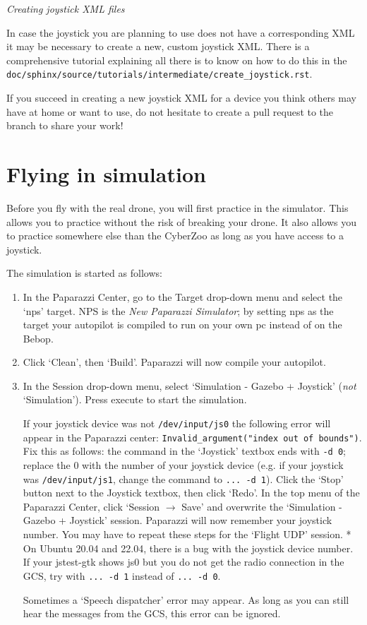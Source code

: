 \textit{Creating joystick XML files}

In case the joystick you are planning to use does not have a corresponding XML it may be necessary to create a new, custom joystick XML. There is a comprehensive tutorial explaining all there is to know on how to do this in the \texttt{doc/sphinx/source/tutorials/intermediate/create\_joystick.rst}.

If you succeed in creating a new joystick XML for a device you think others may have at home or want to use, do not hesitate to create a pull request to the \coursebranch{} branch to share your work!

\section{Flying in simulation}
Before you fly with the real drone, you will first practice in the simulator.
This allows you to practice without the risk of breaking your drone. It also allows you to practice somewhere else than the CyberZoo as long as you have access to a joystick.

\medskip

The simulation is started as follows:
\begin{enumerate}
	\item In the Paparazzi Center, go to the Target drop-down menu and select the `nps' target. NPS is the \emph{New Paparazzi Simulator}; by setting nps as the target your autopilot is compiled to run on your own pc instead of on the Bebop.
	\item Click `Clean', then `Build'. Paparazzi will now compile your autopilot.
	\item In the Session drop-down menu, select `Simulation - Gazebo + Joystick' (\emph{not} `Simulation'). Press execute to start the simulation.
	
	If your joystick device was not \verb"/dev/input/js0" the following error will appear in the Paparazzi center: \verb|Invalid_argument("index out of bounds")|. Fix this as follows: the command in the `Joystick' textbox ends with \verb"-d 0"; replace the 0 with the number of your joystick device (e.g. if your joystick was \verb"/dev/input/js1", change the command to \verb"... -d 1"). Click the `Stop' button next to the Joystick textbox, then click `Redo'. In the top menu of the Paparazzi Center, click `Session $\rightarrow$ Save' and overwrite the `Simulation - Gazebo + Joystick' session. Paparazzi will now remember your joystick number. You may have to repeat these steps for the `Flight UDP' session.
	* On Ubuntu 20.04 and 22.04, there is a bug with the joystick device number. If your jstest-gtk shows js0 but you do not get the radio connection in the GCS, try with \verb"... -d 1" instead of \verb"... -d 0".
	
	Sometimes a `Speech dispatcher' error may appear. As long as you can still hear the messages from the GCS, this error can be ignored.
\end{enumerate}

